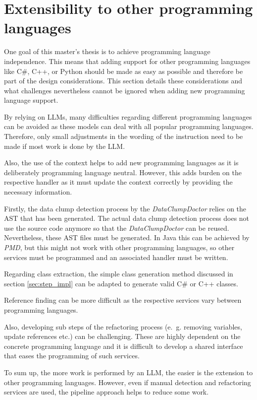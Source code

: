 \section{Extensibility to  other programming languages}\label{sec:lang_indep}

One goal of this master's thesis is to achieve programming language independence. This means that adding support for other programming languages like  C\#, C++, or Python should be made as easy as possible and therefore be part of the design considerations. This section details these considerations and what challenges nevertheless cannot be ignored when adding new programming language support.

By relying on \acp{LLM}, many difficulties regarding different programming languages can be avoided as these models can deal  with all popular programming languages. Therefore, only small adjustments in the wording of the instruction need to be made if most work is done by the \ac{LLM}.

Also, the use of the context helps to add new programming languages as it is deliberately programming language neutral. However, this adds burden on the respective handler as it must update the context correctly by providing the necessary information. 

Firstly, the data clump detection process by the \textit{DataClumpDoctor} relies on the \ac{AST} that has been generated. The actual data clump detection process does not use the source code anymore so that the \textit{DataClumpDoctor} can be reused. Nevertheless, these \ac{AST} files must be generated. In Java this can be achieved by \textit{PMD}, but this might not work with other programming languages, so other services must be programmed and an associated handler must be written.

Regarding class extraction, the simple class generation method discussed in section \ref{sec:step_impl} can be adapted to generate valid C\# or C++ classes.

Reference finding can be more difficult as the respective services vary between programming languages.

Also, developing sub steps  of the refactoring process (e.~g. removing variables, update references etc.) can be challenging. These are highly dependent on the concrete programming language and it is difficult to develop a shared interface that eases the programming of such services.

To sum up, the more work is performed by an \ac{LLM}, the easier is the extension to other programming languages. However, even if manual detection and refactoring services are used, the pipeline approach helps to reduce some work.  

